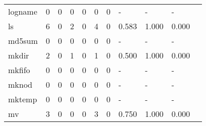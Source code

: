 \begin{longtable}{lp{1.10cm}p{1.10cm}p{1.10cm}p{1.10cm}p{1.10cm}p{1.10cm}p{1.10cm}p{1.10cm}p{1.10cm}p{1.10cm}}
logname   &                      0 &                                  0 &                                 0 &                                0 &                                 0 &                               0 &                              - &                                     - &                                   - \\
ls        &                      6 &                                  0 &                                 2 &                                0 &                                 4 &                               0 &                          0.583 &                                 1.000 &                               0.000 \\
md5sum    &                      0 &                                  0 &                                 0 &                                0 &                                 0 &                               0 &                              - &                                     - &                                   - \\
mkdir     &                      2 &                                  0 &                                 1 &                                0 &                                 1 &                               0 &                          0.500 &                                 1.000 &                               0.000 \\
mkfifo    &                      0 &                                  0 &                                 0 &                                0 &                                 0 &                               0 &                              - &                                     - &                                   - \\
mknod     &                      0 &                                  0 &                                 0 &                                0 &                                 0 &                               0 &                              - &                                     - &                                   - \\
mktemp    &                      0 &                                  0 &                                 0 &                                0 &                                 0 &                               0 &                              - &                                     - &                                   - \\
mv        &                      3 &                                  0 &                                 0 &                                0 &                                 3 &                               0 &                          0.750 &                                 1.000 &                               0.000 \\

\end{longtable}
